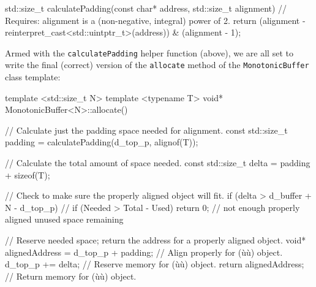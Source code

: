 \begin{emcppslisting}
std::size_t calculatePadding(const char* address, std::size_t alignment)
    // Requires: alignment is a (non-negative, integral) power of 2.
{
    return (alignment - reinterpret_cast<std::uintptr_t>(address)) &
           (alignment - 1);
}
\end{emcppslisting}

\noindent Armed with the
\lstinline!calculatePadding! helper function (above), we are all set to write the final (correct) version of the \lstinline!allocate! method of the \lstinline!MonotonicBuffer! class template:

\begin{emcppslisting}
template <std::size_t N>
template <typename T>
void* MonotonicBuffer<N>::allocate()
{
    // Calculate just the padding space needed for alignment.
    const std::size_t padding = calculatePadding(d_top_p, alignof(T));

    // Calculate the total amount of space needed.
    const std::size_t delta = padding + sizeof(T);

    // Check to make sure the properly aligned object will fit.
    if (delta > d_buffer + N - d_top_p)  // if (Needed > Total - Used)
    {
        return 0;  // not enough properly aligned unused space remaining
    }

    // Reserve needed space; return the address for a properly aligned object.
    void* alignedAddress = d_top_p + padding;  // Align properly for (ù{}ù) object.
    d_top_p += delta;                          // Reserve memory for (ù{}ù) object.
    return alignedAddress;                     // Return memory for (ù{}ù) object.
}
\end{emcppslisting}

